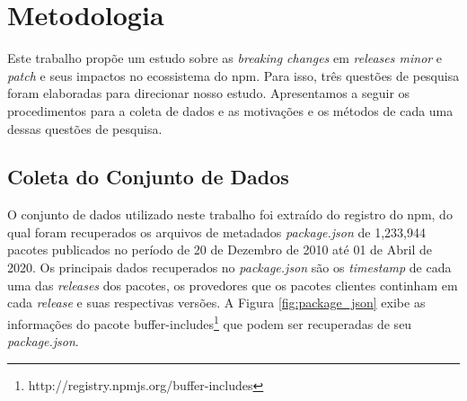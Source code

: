 \chapter{Metodologia}
\label{cap:qp}

Este trabalho propõe um estudo sobre as \textit{breaking changes} em \textit{releases minor} e \textit{patch} e seus impactos no ecossistema do \textsf{npm}. Para isso, três questões de pesquisa foram elaboradas para direcionar nosso estudo. Apresentamos a seguir os procedimentos para a coleta de dados e as motivações e os métodos de cada uma dessas questões de pesquisa.

\section{Coleta do Conjunto de Dados}
\label{sec:col_base}
O conjunto de dados utilizado neste trabalho foi extraído do registro do \textsf{npm}, do qual foram recuperados os arquivos de metadados \textit{package.json} de 1,233,944 pacotes publicados no período de 20 de Dezembro de 2010 até 01 de Abril de 2020. Os principais dados recuperados no \textit{package.json} são os \textit{timestamp} de cada uma das \textit{releases} dos pacotes, os provedores que os pacotes clientes continham em cada \textit{release} e suas respectivas versões. A Figura \ref{fig:package_json} exibe as informações do pacote \textsf{buffer-includes}\footnote{http://registry.npmjs.org/buffer-includes} que podem ser recuperadas de seu \textit{package.json}.

